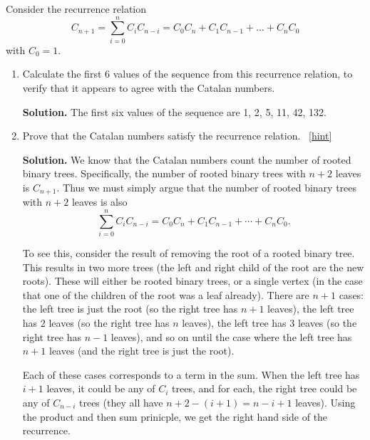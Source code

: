 \documentclass{book}
\begin{document}
\setcounter{project}{181}
\addtocounter{project}{-1}
\begin{activity}[]\label{activity-174}
\hypertarget{p-1073}{}%
Consider the recurrence relation%
\begin{equation*}
C_{n + 1} = \sum_{i = 0}^n C_iC_{n-i} = C_{0}C_{n} + C_{1}C_{n - 1} + \ldots + C_{n}C_{0}
\end{equation*}
with \(C_0 = 1\).%
\begin{enumerate}[font=\bfseries,label=(\alph*),ref=\alph*]
\item\label{task-192} \hypertarget{p-1074}{}%
Calculate the first 6 values of the sequence from this recurrence relation, to verify that it appears to agree with the Catalan numbers.%
\par\smallskip%
\noindent\textbf{Solution.}\hypertarget{solution-111}{}\quad%
\hypertarget{p-1075}{}%
The first six values of the sequence are 1, 2, 5, 11, 42, 132.%
\item\label{task-193} \hypertarget{p-1076}{}%
Prove that the Catalan numbers satisfy the recurrence relation.%
~\hfill{\tiny\hyperlink{a-181.b}{[hint]}\hypertarget{q-181.b}{}}\par\smallskip%
\noindent\textbf{Solution.}\hypertarget{solution-112}{}\quad%
\hypertarget{p-1078}{}%
We know that the Catalan numbers count the number of rooted binary trees.  Specifically, the number of rooted binary trees with \(n+2\) leaves is \(C_{n+1}\).  Thus we must simply argue that the number of rooted binary trees with \(n+2\) leaves is also%
\begin{equation*}
\sum_{i=0}^{n} C_iC_{n-i} = C_0C_{n} + C_1C_{n-1} + \cdots + C_{n}C_0.
\end{equation*}
%
\par
\hypertarget{p-1079}{}%
To see this, consider the result of removing the root of a rooted binary tree.  This results in two more trees (the left and right child of the root are the new roots).  These will either be rooted binary trees, or a single vertex (in the case that one of the children of the root was a leaf already).  There are \(n+1\) cases: the left tree is just the root (so the right tree has \(n+1\) leaves), the left tree has 2 leaves (so the right tree has \(n\) leaves), the left tree has 3 leaves (so the right tree has \(n-1\) leaves), and so on until the case where the left tree has \(n+1\) leaves (and the right tree is just the root).%
\par
\hypertarget{p-1080}{}%
Each of these cases corresponds to a term in the sum.  When the left tree has \(i+1\) leaves, it could be any of \(C_{i}\) trees, and for each, the right tree could be any of \(C_{n-i}\) trees (they all have \(n+2-(i+1) = n-i+1\) leaves).  Using the product and then sum prinicple, we get the right hand side of the recurrence.%

\end{enumerate}
\end{activity}
\end{document}
